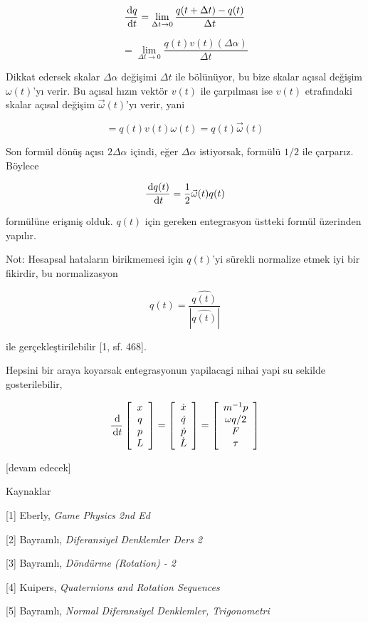 \documentclass[12pt,fleqn]{article}\usepackage{../../common}
\begin{document}
$$
\frac{\,\mathrm{d} q}{\,\mathrm{d} t} = \lim_{\Delta t \to 0} \frac{q(t + \Delta t) - q(t)}{\Delta t}
$$

$$
= \lim_{\Delta t \to 0} \frac{q(t) v(t) (\Delta \alpha)}{\Delta t}
$$

Dikkat edersek skalar $\Delta \alpha$ değişimi $\Delta t$ ile bölünüyor, bu bize
skalar açısal değişim $\omega(t)$'yı verir. Bu açısal hızın vektör $v(t)$ ile
çarpılması ise $v(t)$ etrafındaki skalar açısal değişim $\vec{\omega}(t)$'yı
verir, yani

$$
= q(t) v(t) \omega(t) = q(t) \vec{\omega}(t)
$$

Son formül dönüş açısı $2 \Delta \alpha$ içindi, eğer $\Delta \alpha$
istiyorsak, formülü $1/2$ ile çarparız. Böylece 

$$
\frac{\,\mathrm{d} q(t)}{\,\mathrm{d} t} = \frac{1}{2} \vec{\omega}(t) q(t)
$$

formülüne erişmiş olduk. $q(t)$ için gereken entegrasyon üstteki formül
üzerinden yapılır.

Not: Hesapsal hataların birikmemesi için $q(t)$'yi sürekli normalize etmek
iyi bir fikirdir, bu normalizasyon

$$
q(t) = \frac{\hat{q(t)}}{|\hat{q(t)}|}
$$

ile gerçekleştirilebilir [1, sf. 468].

Hepsini bir araya koyarsak entegrasyonun yapilacagi nihai yapi su sekilde
gosterilebilir,

$$
\frac{\,\mathrm{d}}{\,\mathrm{d} t}
\left[\begin{array}{c}
x \\ q \\ p  \\ L
\end{array}\right] =
\left[\begin{array}{c}
\dot{x} \\ \dot{q} \\ \dot{p}  \\ \dot{L}
\end{array}\right] =
\left[\begin{array}{ccc}
m^{-1} p \\ \omega q / 2 \\ F \\ \tau
\end{array}\right]
$$

[devam edecek]

Kaynaklar

[1] Eberly, {\em Game Physics 2nd Ed}

[2] Bayramlı, {\em Diferansiyel Denklemler Ders 2}

[3] Bayramlı, {\em Döndürme (Rotation) - 2}

[4] Kuipers, {\em Quaternions and Rotation Sequences}

[5] Bayramlı, {\em Normal Diferansiyel Denklemler, Trigonometri}
\end{document}
